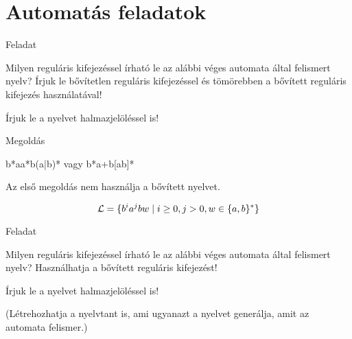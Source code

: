 \documentclass[
    ignorenonframetext
    ]{beamer}
\begin{document}
\section{Automatás feladatok}
\begin{frame}
    {Feladat}

    Milyen reguláris kifejezéssel írható le az alábbi véges automata által
    felismert nyelv? Írjuk le bővítetlen reguláris kifejezéssel és tömörebben
    a bővített reguláris kifejezés használatával!



   Írjuk le a nyelvet halmazjelöléssel is!

   \megoldasjon
\end{frame}

\begin{frame}
    {Megoldás}

    b*aa*b(a|b)* \quad vagy \quad b*a+b[ab]*

    Az első megoldás nem használja a bővített nyelvet.

    \[{\cal L} = \{b^ia^jbw \mid i\ge 0, j> 0, w \in \{a,b\}^*\}\]
\end{frame}

\begin{frame}
    {Feladat}

    Milyen reguláris kifejezéssel írható le az alábbi véges automata által
    felismert nyelv? Használhatja a bővített reguláris kifejezést!


   Írjuk le a nyelvet halmazjelöléssel is!

   (Létrehozhatja a nyelvtant is, ami ugyanazt a nyelvet generálja,
   amit az automata felismer.)

   \megoldasjon
\end{frame}
\end{document}
